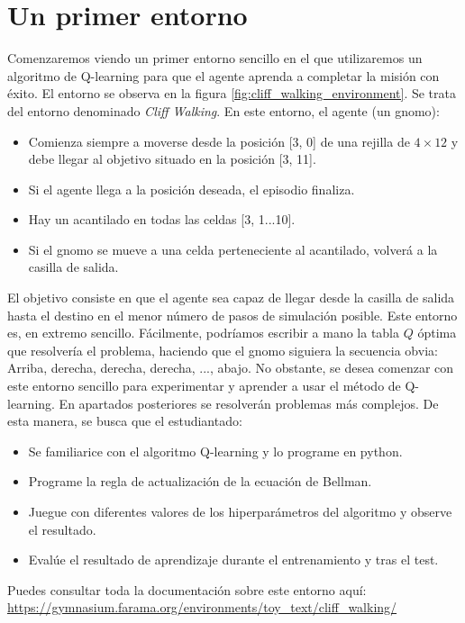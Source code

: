 \documentclass{article}
\begin{document}
\section{Un primer entorno}
Comenzaremos viendo un primer entorno sencillo en el que utilizaremos un algoritmo de Q-learning para que el agente aprenda a completar la misión con éxito. El entorno se observa en la figura \ref{fig:cliff_walking_environment}. Se trata del entorno denominado \textit{Cliff Walking}. En este entorno, el agente (un gnomo):
\begin{itemize}
    \item Comienza siempre a moverse desde la posición [3, 0] de una rejilla de $4\times12$ y debe llegar al objetivo situado en la posición [3, 11].
    \item Si el agente llega a la posición deseada, el episodio finaliza.
    \item Hay un acantilado en todas las celdas [3, 1...10]. 
    \item Si el gnomo se mueve a una celda perteneciente al acantilado, volverá a la casilla de salida.
\end{itemize}

El objetivo consiste en que el agente sea capaz de llegar desde la casilla de salida hasta el destino en el menor número de pasos de simulación posible. Este entorno es, en extremo sencillo. Fácilmente, podríamos escribir a mano la tabla $Q$ óptima que resolvería el problema, haciendo que el gnomo siguiera la secuencia obvia: Arriba, derecha, derecha, derecha, ..., abajo. No obstante, se desea comenzar con este entorno sencillo para experimentar y aprender a usar el método de Q-learning. En apartados posteriores se resolverán problemas más complejos. De esta manera, se busca que el estudiantado:
\begin{itemize}
    \item Se familiarice con el algoritmo Q-learning y lo programe en python.
    \item Programe la regla de actualización de la ecuación de Bellman.    
    \item Juegue con diferentes valores de los hiperparámetros del algoritmo y observe el resultado.
    \item Evalúe el resultado de aprendizaje durante el entrenamiento y tras el test.
\end{itemize}

Puedes consultar toda la documentación sobre este entorno aquí:  \url{https://gymnasium.farama.org/environments/toy_text/cliff_walking/}
\end{document}
